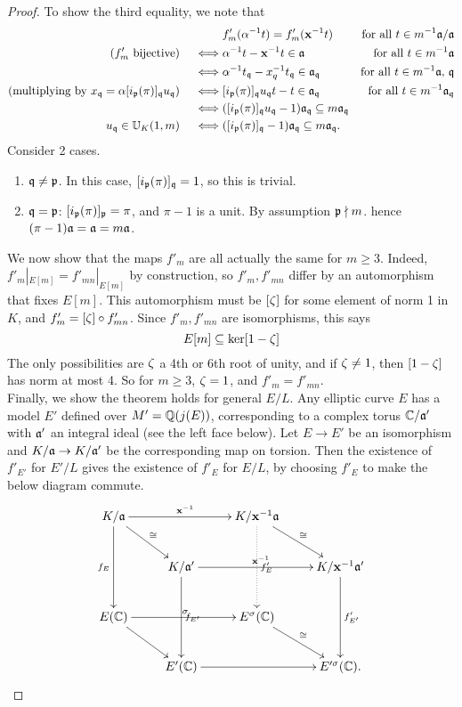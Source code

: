 \begin{proof}
To show the third equality, we note that
\begin{align*}
&f'_m(\alpha^{-1}t)=f'_m(\mathbf{x}^{-1}t)&\text{for all } t\in m^{-1}\mathfrak{a}/\mathfrak{a}\\
(f'_m\text{ bijective})\quad \iff& \alpha^{-1}t-\mathbf{x}^{-1}t\in \mathfrak{a} &\text{for all } t\in m^{-1}\mathfrak{a}\\
\iff&\alpha^{-1}t_{\mathfrak{q}}-x_q^{-1}t_{\mathfrak{q}} \in \mathfrak{a}_{\mathfrak{q}}&\text{for all } t\in m^{-1}\mathfrak{a},\,\mathfrak{q}\\
\text{(multiplying by $x_{\mathfrak{q}}=\alpha [i_{\mathfrak{p}}(\pi)]_{\mathfrak{q}} u_{\mathfrak{q}}$)} \quad \iff 
& [i_{\mathfrak{p}}(\pi)]_{\mathfrak{q}} u_{\mathfrak{q}}t-t\in \mathfrak{a}_{\mathfrak{q}} &\text{for all }t\in m^{-1}\mathfrak{a}_{\mathfrak{q}}\\
\iff& ([i_{\mathfrak{p}}(\pi)]_{\mathfrak{q}} u_{\mathfrak{q}}-1)\mathfrak{a}_{\mathfrak{q}}\subseteq m\mathfrak{a}_{\mathfrak{q}}\\
u_{\mathfrak{q}}\in \mathbb U_K(1,m)  \quad \iff &
([i_{\mathfrak{p}}(\pi)]_{\mathfrak{q}}-1)\mathfrak{a}_{\mathfrak{q}}\subseteq m\mathfrak{a}_{\mathfrak{q}}.
\end{align*}
Consider 2 cases.
\begin{enumerate}
\item $\mathfrak{q}\ne \mathfrak{p}$. In this case, $[i_{\mathfrak{p}}(\pi)]_{\mathfrak{q}}=1$, so this is trivial.
\item $\mathfrak{q}= \mathfrak{p}$: $[i_{\mathfrak{p}}(\pi)]_{\mathfrak{p}}=\pi$, and $\pi-1$ is a unit. By assumption $\mathfrak{p}\nmid m$. hence $(\pi-1)\mathfrak{a}=\mathfrak{a}=m\mathfrak{a}$.
\end{enumerate}

We now show that the maps $f'_m$ are all actually the same for $m\ge 3$. Indeed, $f'_m|_{E[m]}=f'_{mn}|_{E[m]}$ by construction, so $f'_m,f'_{mn}$ differ by an automorphism that fixes $E[m]$. This automorphism must be $[\zeta]$ for some element of norm 1 in $K$, and $f'_m=[\zeta]\circ f'_{mn}$. Since $f'_m,f'_{mn}$ are isomorphisms, this says
\[
E[m]\subseteq \ker [1-\zeta]
\]
The only possibilities are $\zeta$ a 4th or 6th root of unity, and if $\zeta\ne 1$, then $[1-\zeta]$ has norm at most 4. So for $m\ge 3$, $\zeta=1$, and $f'_m=f'_{mn}$.\\

Finally, we show the theorem holds for general $E/L$. Any elliptic curve $E$ has a model $E'$ defined over $M'=\mathbb{Q}(j(E))$, corresponding to a complex torus $\mathbb{C}/\mathfrak{a}'$ with $\mathfrak{a}'$ an integral ideal (see the left face below). Let $E\to E'$ be an isomorphism and $K/\mathfrak{a}\to K/\mathfrak{a}'$ be the corresponding map on torsion. Then the existence of $f'_{E'}$ for $E'/L$ gives the existence of $f'_{E}$ for $E/L$, by choosing $f'_{E}$ to make the below diagram commute.
\[
\xymatrix{
K/\ma\ar[rr]^{\mx^{-1}}\ar[rd]^{\cong}
\ar[dd]_{f_E} & & K/\mx^{-1}\ma \ar@{.>}[dd]^{f_E'}\ar[rd]^{\cong} & \\
& K/\ma' \ar[rr]^{\mx^{-1}} \ar[dd]^{f_{E'}} & & K/\mx^{-1}\ma'\ar[dd]^{f'_{E'}}\\
E(\C) \ar[rr]^{\si} \ar[rd]& & 
E^{\si}(\C)\ar[rd]^{\cong} &\\
& E'(\C)\ar[rr] & & E'^{\si}(\C).
}
\]
\end{proof}

